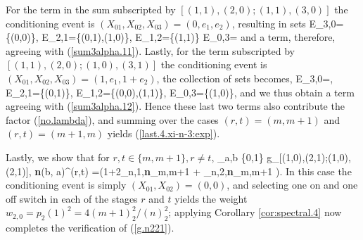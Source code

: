 \documentclass[10pt, amstex]{article}
\begin{document}
For the term in the sum subscripted by $[(1, 1), (2, 0); (1, 1), (3, 0)]$ the conditioning event
is $(X_{01},X_{02},X_{03})=(0,e_1,e_2)$, resulting in sets
\beas
E_{3,0}=\{(0,0)\}, \quad E_{2,1}=\{(0,1),(1,0)\}, \quad E_{1,2}=\{(1,1)\}  E_{0,3}=\emptyset
\enas
and a term, therefore, agreeing with (\ref{sum3alpha.11}). Lastly, for the term subscripted by $[(1, 1), (2, 0); (1, 0), (3, 1)]$ the conditioning event is $(X_{01},X_{02},X_{03})=(1, e_1,1+e_2)$,
the collection of sets becomes,
\beas
E_{3,0}=\emptyset, \quad E_{2,1}=\{(0,1)\}, \quad E_{1,2}=\{(0,0),(1,1)\},  E_{0,3}=\{(1,0)\},
\enas
and we thus obtain a term agreeing with (\ref{sum3alpha.12}). Hence these last two terms
also contribute the factor (\ref{no.lambda}), and summing over the cases
$(r,t)=(m,m+1)$ and $(r,t)=(m+1,m)$ yields (\ref{last.4.xi-n-3:exp}).

Lastly, we show that for $r,t \in \{m,m+1\},r \not = t$,
\bea \label{g.n221}
\sum_{a,b \in \{0,1\}} g_{[(1,0),(2,1);(1,0),(2,1)], {\bf n}(b, a)}^{(r,t)} =\left(1+2\lambda_{n,1,{\bf n}_{m,m+1}} + \lambda_{n,2,{\bf n}_{m,m+1} } \right).
\ena
In this case the conditioning event is simply $(X_{01},X_{02})=(0,0)$,
and selecting one on and one off switch in each of the stages $r$ and $t$ yields the weight $w_{2,0}=p_2(1)^2=4(m+1)_2^2/(n)_2^2$; applying Corollary \ref{cor:spectral.4} now completes the verification of (\ref{g.n221}).
\end{document}
